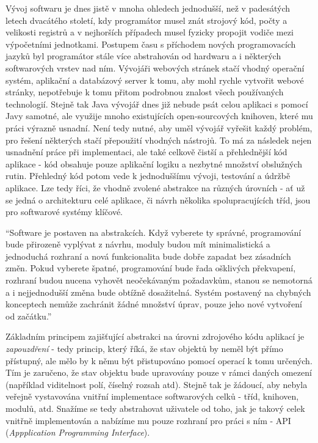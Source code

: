 Vývoj softwaru je dnes jistě v mnoha ohledech jednodušší, než v padesátých letech dvacátého století, kdy programátor musel znát strojový kód, počty a velikosti registrů a v nejhorších případech musel fyzicky propojit vodiče mezi výpočetními jednotkami. Postupem času s příchodem nových programovacích jazyků byl programátor stále více abstrahován od hardwaru a i některých softwarových vrstev nad ním. Vývojáři webových stránek stačí vhodný operační systém, aplikační a databázový server k tomu, aby mohl rychle vytvořit webové stránky, nepotřebuje k tomu přitom podrobnou znalost všech používaných technologií. Stejně tak Java vývojář dnes již nebude psát celou aplikaci s pomocí Javy samotné, ale využije mnoho existujících open-sourcových knihoven, které mu práci výrazně usnadní. Není tedy nutné, aby uměl vývojář vyřešit každý problém, pro řešení některých stačí přepoužití vhodných nástrojů. To má za následek nejen usnadnění práce při implementaci, ale také celkově čistší a přehlednější kód aplikace - kód obsahuje pouze aplikační logiku a nezbytné množství obslužných rutin. Přehledný kód potom vede k jednoduššímu vývoji, testování a údržbě aplikace. Lze tedy říci, že vhodně zvolené abstrakce na různých úrovních - ať už se jedná o architekturu celé aplikace, či návrh několika spolupracujících tříd, jsou pro softwarové systémy klíčové.

``Software je postaven na abstrakcích. Když vyberete ty správné, programování bude přirozeně vyplývat z návrhu, moduly budou mít minimalistická a jednoduchá rozhraní a nová funkcionalita bude dobře zapadat bez zásadních změn. Pokud vyberete špatné, programování bude řada ošklivých překvapení, rozhraní budou nucena vyhovět neočekávaným požadavkům, stanou se nemotorná a i nejjednodušší změna bude obtížně dosažitelná. Systém postavený na chybných konceptech nemůže zachránit žádné množství úprav, pouze jeho nové vytvoření od začátku.'' \cite{Jackson06}

Základním principem zajišťující abstrakci na úrovni zdrojového kódu aplikací je \textit{zapouzdření} - tedy princip, který říká, že stav objektů by neměl být přímo přístupný, ale mělo by k němu být přistupováno pomocí operací k tomu určených. Tím je zaručeno, že stav objektu bude upravovány pouze v rámci daných omezení (například viditelnost polí, číselný rozsah atd). Stejně tak je žádoucí, aby nebyla veřejně vystavována vnitřní implementace softwarových celků - tříd, knihoven, modulů, atd. Snažíme se tedy abstrahovat uživatele od toho, jak je takový celek vnitřně implementován a nabízíme mu pouze rozhraní pro práci s ním - API (\textit{Appplication Programming Interface}).

